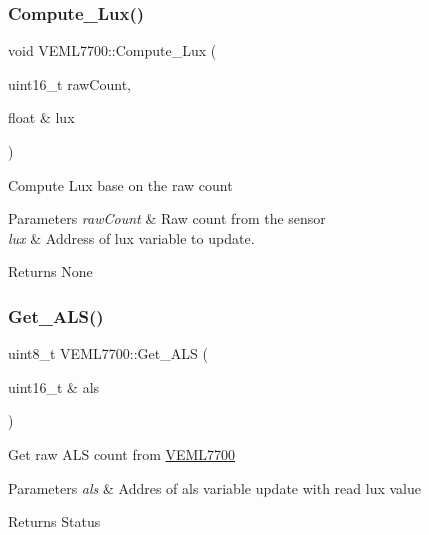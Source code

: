 \mbox{\label{classVEML7700_a1e7056289f5d716f0d120cc5798d664a}} 
\subsubsection{\texorpdfstring{Compute\+\_\+\+Lux()}{Compute\_Lux()}}
{\footnotesize\ttfamily void V\+E\+M\+L7700\+::\+Compute\+\_\+\+Lux (\begin{DoxyParamCaption}\item[{uint16\+\_\+t}]{raw\+Count,  }\item[{float \&}]{lux }\end{DoxyParamCaption})\hspace{0.3cm}{\ttfamily [private]}}

Compute Lux base on the raw count


\begin{DoxyParams}{Parameters}
{\em raw\+Count} & Raw count from the sensor \\
\hline
{\em lux} & Address of lux variable to update.\\
\hline
\end{DoxyParams}
\begin{DoxyReturn}{Returns}
None 
\end{DoxyReturn}
\mbox{\label{classVEML7700_a6a5e3bcbf41bc103823ca4d9f26ce31f}} 
\subsubsection{\texorpdfstring{Get\+\_\+\+A\+L\+S()}{Get\_ALS()}}
{\footnotesize\ttfamily uint8\+\_\+t V\+E\+M\+L7700\+::\+Get\+\_\+\+A\+LS (\begin{DoxyParamCaption}\item[{uint16\+\_\+t \&}]{als }\end{DoxyParamCaption})\hspace{0.3cm}{\ttfamily [private]}}

Get raw A\+LS count from \hyperlink{classVEML7700}{V\+E\+M\+L7700}


\begin{DoxyParams}{Parameters}
{\em als} & Addres of als variable update with read lux value\\
\hline
\end{DoxyParams}
\begin{DoxyReturn}{Returns}
Status 
\end{DoxyReturn}
\mbox{\label{classVEML7700_acf024ffb95cc98d82a708f511ec63d4e}} 
